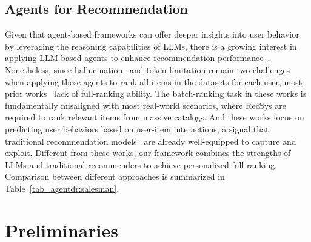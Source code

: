 \subsection{Agents for Recommendation}
Given that agent-based frameworks can offer deeper insights into user behavior by leveraging the reasoning capabilities of LLMs, there is a growing interest in applying LLM-based agents to enhance recommendation performance~\cite{recmind, interecagent, agentcf, iagent}. 
Nonetheless, since hallucination~\cite{hallu1, hallu2} and token limitation remain two challenges when applying these agents to rank all items in the datasets for each user, most prior works~\cite{agentcf, recmind, interecagent, agent4rec, recagent, iagent} lack of full-ranking ability. The batch-ranking task in these works is fundamentally misaligned with most real-world scenarios, where RecSys are required to rank relevant items from massive catalogs. And these works focus on predicting user behaviors based on user-item interactions, a signal that traditional recommendation models~\cite{LightGCN, sasrec, simplex} are already well-equipped to capture and exploit. Different from these works, our framework combines the strengths of LLMs and traditional recommenders to achieve personalized full-ranking. Comparison between different approaches is summarized in Table~\ref{tab_agentdr:salesman}.


\section{Preliminaries}
